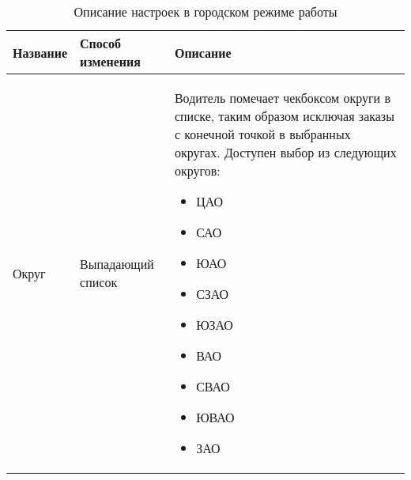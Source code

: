       \begin{table}
          \begin{center}
          \caption {Описание настроек в городском режиме работы}
          \label{table:driver_app_robot_tab_table_town_mode}
          \setlength{\extrarowheight}{2mm}
          \begin{tabular}{|p{4cm}|p{3cm}|p{8cm}|}

            \hline     \textbf{Название}&\textbf{Способ изменения}&\textbf{Описание} \\ [2mm]

            \hline   Округ & Выпадающий список & Водитель помечает чекбоксом округи в списке, таким образом исключая заказы с конечной точкой в выбранных округах. Доступен выбор из следующих округов: \begin{itemize} \item ЦАО \item САО \item ЮАО \item СЗАО \item ЮЗАО \item ВАО \item СВАО \item ЮВАО \item ЗАО \end{itemize} \\ [2mm]

            \hline
          \end{tabular}
          \end{center}
      \end{table}        

